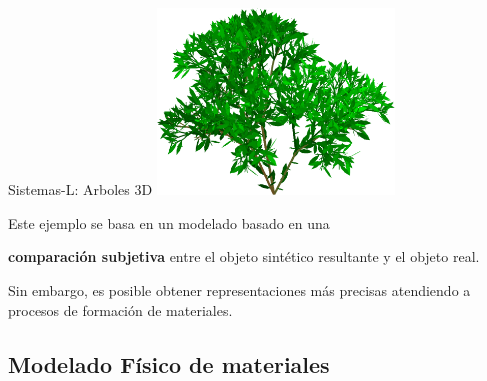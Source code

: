 \documentclass[spanish,unknownkeysallowed]{beamer}
\begin{document}
\begin{frame}{Sistemas-L: Arboles 3D}
\center
\includegraphics[width=6.3cm]{../figures/3dlsystem}

\end{frame}

\begin{frame}
Este ejemplo se basa en un modelado basado en una 

\textbf{comparación subjetiva} entre el objeto sintético resultante y el objeto real.

\vspace{1cm}

Sin embargo, es posible obtener representaciones más precisas atendiendo a procesos de formación de materiales.
\end{frame}

\subsection{Modelado Físico de materiales}
\end{document}

